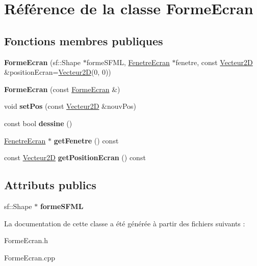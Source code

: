 \hypertarget{class_forme_ecran}{}\section{Référence de la classe Forme\+Ecran}
\label{class_forme_ecran}
\subsection*{Fonctions membres publiques}
\begin{DoxyCompactItemize}
\item 
\mbox{\label{class_forme_ecran_a719711c110f071c2924fd2a3dc3ae040}} 
{\bfseries Forme\+Ecran} (sf\+::\+Shape $\ast$forme\+S\+F\+ML, \mbox{\hyperlink{class_fenetre_ecran}{Fenetre\+Ecran}} $\ast$fenetre, const \mbox{\hyperlink{class_vecteur2_d}{Vecteur2D}} \&position\+Ecran=\mbox{\hyperlink{class_vecteur2_d}{Vecteur2D}}(0, 0))
\item 
\mbox{\label{class_forme_ecran_a389a4eef0f47f3451440113055453052}} 
{\bfseries Forme\+Ecran} (const \mbox{\hyperlink{class_forme_ecran}{Forme\+Ecran}} \&)
\item 
\mbox{\label{class_forme_ecran_aa96940cf8b569c9ba9376d3d4accba80}} 
void {\bfseries set\+Pos} (const \mbox{\hyperlink{class_vecteur2_d}{Vecteur2D}} \&nouv\+Pos)
\item 
\mbox{\label{class_forme_ecran_abd24ffecc0acb7f75635dd5a9b96cc63}} 
const bool {\bfseries dessine} ()
\item 
\mbox{\label{class_forme_ecran_a781177121ce901c848958800e0ce12ec}} 
\mbox{\hyperlink{class_fenetre_ecran}{Fenetre\+Ecran}} $\ast$ {\bfseries get\+Fenetre} () const
\item 
\mbox{\label{class_forme_ecran_a6bf6d1c849fed205f2fc7f1a822ee383}} 
const \mbox{\hyperlink{class_vecteur2_d}{Vecteur2D}} {\bfseries get\+Position\+Ecran} () const
\end{DoxyCompactItemize}
\subsection*{Attributs publics}
\begin{DoxyCompactItemize}
\item 
\mbox{\label{class_forme_ecran_ae4802e73968518593b6249ed52c7f42f}} 
sf\+::\+Shape $\ast$ {\bfseries forme\+S\+F\+ML}
\end{DoxyCompactItemize}


La documentation de cette classe a été générée à partir des fichiers suivants \+:\begin{DoxyCompactItemize}
\item 
Forme\+Ecran.\+h\item 
Forme\+Ecran.\+cpp\end{DoxyCompactItemize}
